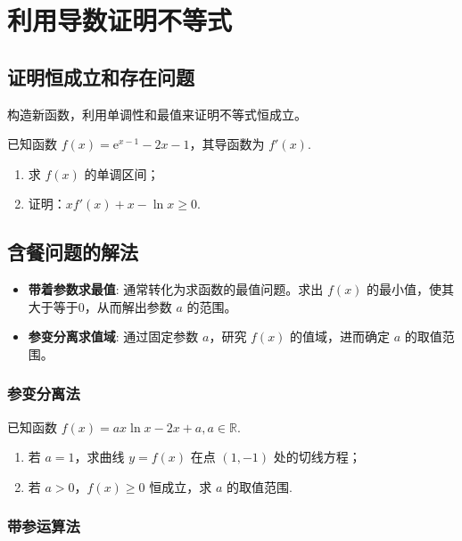 \section{利用导数证明不等式}

\subsection{证明恒成立和存在问题}

\begin{theorem}[利用导数证明不等式]
    构造新函数，利用单调性和最值来证明不等式恒成立。
\end{theorem}
\begin{example}
    已知函数 $f(x) = \mathrm{e}^{x - 1} - 2x - 1$，其导函数为 $f'(x)$.
    \begin{enumerate}
        \item[(1)] 求 $f(x)$ 的单调区间；
        \item[(2)] 证明：$xf'(x) + x - \ln x \geq 0$.
    \end{enumerate}
\end{example}

\vspace{4em}

\subsection{含餐问题的解法}

\begin{theorem}[含参恒成立问题]
    \begin{itemize}
        \item \textbf{带着参数求最值}: 通常转化为求函数的最值问题。求出 $f(x)$ 的最小值，使其大于等于0，从而解出参数 $a$ 的范围。
        \item \textbf{参变分离求值域}: 通过固定参数 $a$，研究 $f(x)$ 的值域，进而确定 $a$ 的取值范围。
    \end{itemize}
\end{theorem}

\subsubsection{参变分离法}

\begin{example}
    已知函数 $f(x) = ax\ln x - 2x + a, a \in \mathbb{R}$.
    \begin{enumerate}
        \item[(1)] 若 $a = 1$，求曲线 $y = f(x)$ 在点 $(1, -1)$ 处的切线方程；
        \item[(2)] 若 $a > 0$，$f(x) \geq 0$ 恒成立，求 $a$ 的取值范围.
    \end{enumerate}
\end{example}

\subsubsection{带参运算法}
